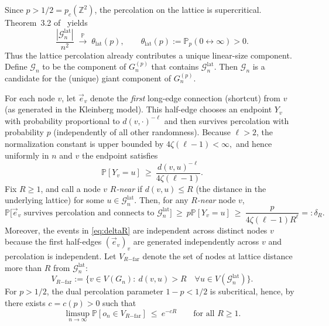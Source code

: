 \documentclass[10pt]{amsart}
\begin{document}
Since $p>1/2=p_c(\mathbb Z^2)$, the percolation on the lattice is supercritical. 
Theorem~3.2 of~\cite{borgs2000lattice} yields
\[
\frac{|\mathcal G_{n}^{\mathrm{lat}}|}{n^2}
\;\xrightarrow{\mathbb P}\;
\theta_{\mathrm{lat}}(p),
\qquad
\theta_{\mathrm{lat}}(p):=\mathbb P_p(0\leftrightarrow\infty)>0.
\]
Thus the lattice percolation already contributes a unique linear-size component.
Define $\mathcal G_n$ to be the component of $G_n^{(p)}$ that contains $\mathcal G_n^{\mathrm{lat}}$.
Then $\mathcal G_n$ is a candidate for the (unique) giant component of $G_n^{(p)}$.

For each node $v$, let $\vec e_v$ denote the \emph{first} long-edge connection (shortcut) from $v$
(as generated in the Kleinberg model).  This half-edge chooses an endpoint $Y_v$ with probability proportional
to $d(v,\cdot)^{-\ell}$ and then survives percolation with probability $p$ (independently of all other randomness). Because $\ell>2$, the normalization constant is upper bounded by
$4\zeta(\ell-1) < \infty,$
and hence uniformly in $n$ and $v$ the endpoint satisfies\[
\mathbb P[Y_v=u]\ \ge\ \frac{d(v,u)^{-\ell}}{4\zeta(\ell-1)}.
\]
Fix $R\ge1$, and call a node $v$ \emph{$R$-near} if $d(v,u)\le R$ (the distance in the underlying lattice) for some $u \in \mathcal G_n^{\mathrm{lat}}$. 
Then, for any \emph{$R$-near} node $v$,
\begin{equation}\label{eq:deltaR}
\mathbb P\bigl[\vec e_v \text{ survives percolation and connects to }\mathcal G_n^{\mathrm{lat}}\bigr]
\ \ge\
p\mathbb P[Y_v=u]
\ \ge\
\frac{p}{4\zeta(\ell-1) R^\ell} =: \delta_R.
\end{equation}
Moreover, the events in \eqref{eq:deltaR} are independent across distinct nodes $v$
because the first half-edges $(\vec e_v)_v$ are generated independently across $v$ and percolation is independent. Let $V_{R\mathrm{-far}}$ denote the set of nodes at lattice distance more than $R$ from $\mathcal G_n^{\mathrm{lat}}$:
\[
V_{R\mathrm{-far}}:=\{v\in V(G_n):\ d(v,u)>R \quad \forall u \in V(\mathcal G_n^{\mathrm{lat}})\}.
\]
For $p>1/2$, the dual percolation parameter $1-p<1/2$ is subcritical, hence, by \cite[ Theorem 1]{vanneuville2025exponential} there exists $c=c(p)>0$ such that
\begin{equation}\label{eq:hole-tail}
\limsup_{n\to\infty}\mathbb P[o_n\in V_{R\mathrm{-far}}]\ \le\ e^{-cR}
\qquad\text{for all }R\ge1.
\end{equation}
\end{document}
